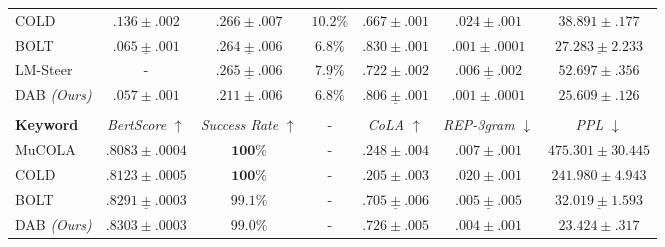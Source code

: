 \begin{table}[t]
{\begin{tabular}{lccc|ccc}
COLD      & $.136 \pm .002$       & $.266 \pm .007$            & $10.2\%$              & $.667 \pm .001$    & $.024 \pm .001$      & $38.891 \pm .177$     \\
BOLT      & $\underline{.065 \pm .001}$       & $\underline{.264 \pm .006}$            & $\mathbf{6.8\%}$     & $\mathbf{.830 \pm .001}$ & $\mathbf{.001 \pm .0001}$ & $\underline{27.283 \pm 2.233}$ \\
LM-Steer  & -                     & $\underline{.265 \pm .006}$            & $\underline{7.9\%}$              & $.722 \pm .002$    & $\underline{.006 \pm .002}$      & $52.697 \pm .356$     \\ 
DAB \textit{(Ours)}    & $\mathbf{.057 \pm .001}$ & $\mathbf{.211 \pm .006}$ & $\mathbf{6.8\%}$     & $\underline{.806 \pm .001}$    & $\mathbf{.001 \pm .0001}$ & $\mathbf{25.609 \pm .126}$ \\[1ex]
\Xhline{1pt} \\[-1ex]
\textbf{Keyword}& \textit{BertScore} $\uparrow$ & \textit{Success Rate} $\uparrow$ & - & \textit{CoLA} $\uparrow$ & \textit{REP-3gram} $\downarrow$ & \textit{PPL} $\downarrow$ \\
\midrule
MuCOLA    & $.8083 \pm .0004$     & $\mathbf{100\%}$           &            -             & $.248 \pm .004$    & $.007 \pm .001$      & $475.301 \pm 30.445$ \\
COLD      & $.8123 \pm .0005$     & $\mathbf{100\%}$           &             -             & $.205 \pm .003$    & $.020 \pm .001$      & $241.980 \pm 4.943$  \\
BOLT      & $\underline{.8291 \pm .0003}$     & $99.1\%$                   &             -             & $\underline{.705 \pm .006}$    & $\underline{.005 \pm .005}$      & $\underline{32.019 \pm 1.593}$   \\
DAB  \textit{(Ours)}    & $\mathbf{.8303 \pm .0003}$ & $99.0\%$               &            -              & $\mathbf{.726 \pm .005}$ & $\mathbf{.004 \pm .001}$ & $\mathbf{23.424 \pm .317}$ \\
\bottomrule
\end{tabular}}
\end{table}